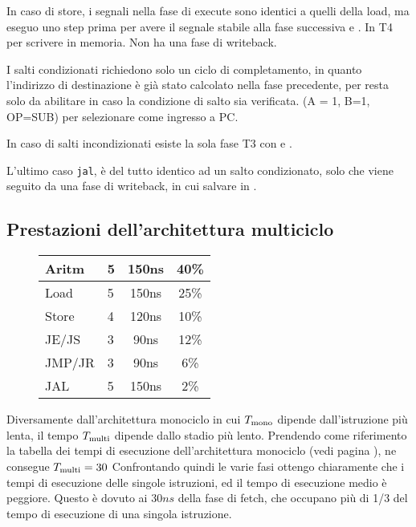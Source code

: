 \documentclass[../ace.tex]{subfiles}
\begin{document}
In caso di store, i segnali nella fase di execute sono identici a quelli della load, ma eseguo  uno step
prima per avere il segnale stabile alla fase successiva e .
In T4  per scrivere in memoria. Non ha una fase di writeback.

I salti condizionati richiedono solo un ciclo di completamento, in quanto l'indirizzo di destinazione è già stato
calcolato nella fase precedente, per resta solo da abilitare  in caso la condizione di salto sia verificata.
(A = 1, B=1, OP=SUB)  per selezionare  come ingresso a PC.

In caso di salti incondizionati esiste la sola fase T3 con  e .

L'ultimo caso \lstinline{jal}, è del tutto identico ad un salto condizionato, solo che viene seguito da una fase di
writeback, in cui salvare  in .
\subsection{Prestazioni dell'architettura multiciclo}
\begin{wrapfigure}{R}{0pt}
    \centering
    \begin{tabu}{|l|lc|c|}
        \hline
        Aritm  & 5& 150ns &40\%\\
        \hline
        Load & 5& 150ns   &25\%\\
        \hline
        Store & 4& 120ns  &10\%\\
        \hline
        JE/JS& 3& 90ns    &12\%\\
        \hline
        JMP/JR& 3& 90ns   &6\%\\
        \hline
        JAL& 5& 150ns     &2\%\\
        \hline
    \end{tabu}
\end{wrapfigure}
Diversamente dall'architettura monociclo in cui $T_\text{mono}$ dipende dall'istruzione più lenta, il tempo $T_\text{multi}$ dipende dallo
stadio più lento.
Prendendo come riferimento la tabella dei tempi di esecuzione dell'architettura monociclo (vedi pagina
\pageref{tab:tempi_esecuzione_monociclo}), ne consegue $T_\text{multi} =30$
Confrontando quindi le varie fasi ottengo chiaramente che i tempi di esecuzione delle singole istruzioni, ed il tempo di
esecuzione medio è peggiore. Questo è dovuto ai $30ns$ della fase di fetch, che occupano più di 1/3 del tempo di
esecuzione di una singola istruzione.
\clearpage
\end{document}
